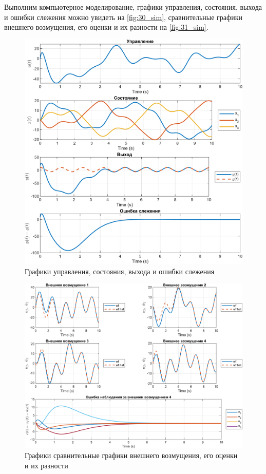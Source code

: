 Выполним компьютерное моделирование, графики управления, состояния, выхода и ошибки слежения 
можно увидеть на \autoref{fig:30_sim}, сравнительные графики внешнего возмущения,
его оценки и их разности на \autoref{fig:31_sim}.

\begin{figure}[H]
    \centering
    \includegraphics[width=\linewidth]{figs/30_sim.png}
    \caption{Графики управления, состояния, выхода и ошибки слежения}
    \label{fig:30_sim}
\end{figure}

\begin{figure}[H]
    \centering
    \includegraphics[width=\linewidth]{figs/31_sim.png}
    \caption{Графики  сравнительные графики внешнего возмущения,
    его оценки и их разности}
    \label{fig:31_sim}
\end{figure}




